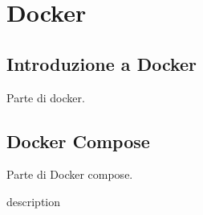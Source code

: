\chapter{Docker} \label{ch:docker2}

\section{Introduzione a Docker} 

Parte di docker.

\section{Docker Compose}

Parte di Docker compose.

description \cite{noms2020}